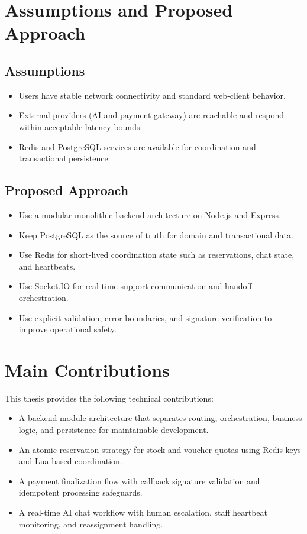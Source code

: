 \section{Assumptions and Proposed Approach}

\subsection{Assumptions}

\begin{itemize}
    \item Users have stable network connectivity and standard web-client behavior.
    \item External providers (AI and payment gateway) are reachable and respond within acceptable latency bounds.
    \item Redis and PostgreSQL services are available for coordination and transactional persistence.
\end{itemize}

\subsection{Proposed Approach}

\begin{itemize}
    \item Use a modular monolithic backend architecture on Node.js and Express.
    \item Keep PostgreSQL as the source of truth for domain and transactional data.
    \item Use Redis for short-lived coordination state such as reservations, chat state, and heartbeats.
    \item Use Socket.IO for real-time support communication and handoff orchestration.
    \item Use explicit validation, error boundaries, and signature verification to improve operational safety.
\end{itemize}

\section{Main Contributions}

This thesis provides the following technical contributions:
\begin{itemize}
    \item A backend module architecture that separates routing, orchestration, business logic, and persistence for maintainable development.
    \item An atomic reservation strategy for stock and voucher quotas using Redis keys and Lua-based coordination.
    \item A payment finalization flow with callback signature validation and idempotent processing safeguards.
    \item A real-time AI chat workflow with human escalation, staff heartbeat monitoring, and reassignment handling.
\end{itemize}


